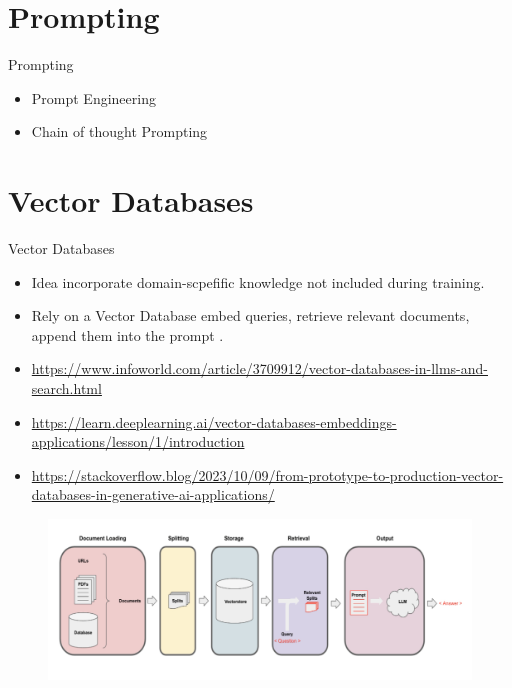 \documentclass[handout]{beamer}
\begin{document}
\section{Prompting}

\begin{frame}{Prompting}
\begin{scriptsize}
\begin{itemize}
\item Prompt Engineering 
\item Chain of thought Prompting
\end{itemize}
\end{scriptsize}
\end{frame}


\section{Vector Databases}

\begin{frame}{Vector Databases}
\begin{scriptsize}
\begin{itemize}
\item Idea incorporate domain-scpefific knowledge not included during training.
\item Rely on a Vector Database embed queries, retrieve relevant documents, append them into the prompt \cite{lewis2021retrievalaugmented}.

\item \url{https://www.infoworld.com/article/3709912/vector-databases-in-llms-and-search.html}
\item \url{https://learn.deeplearning.ai/vector-databases-embeddings-applications/lesson/1/introduction}
\item \url{https://stackoverflow.blog/2023/10/09/from-prototype-to-production-vector-databases-in-generative-ai-applications/}
\end{itemize}
\end{scriptsize}

    \begin{figure}[h]
        	\includegraphics[scale = 0.4]{pics/vectordatabase.png}
        \end{figure}  


\end{frame}
\end{document}
